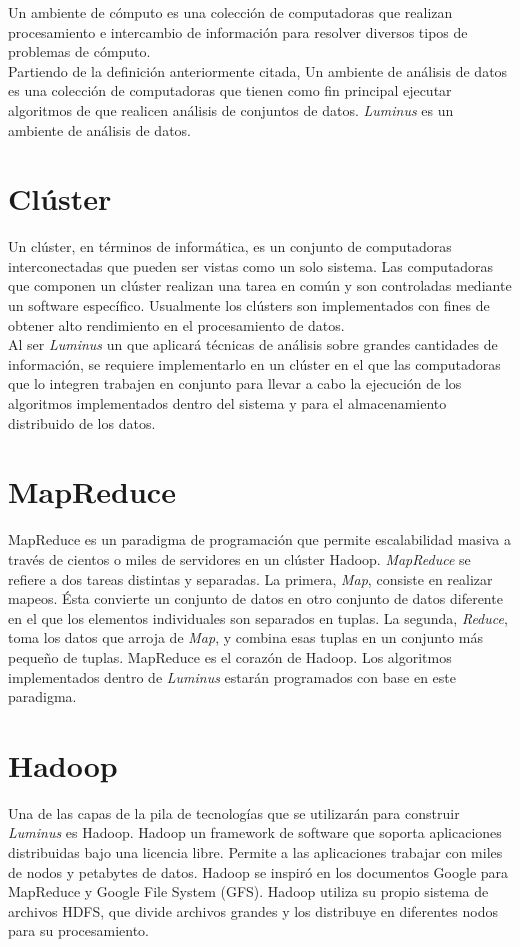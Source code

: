 Un ambiente de cómputo es una colección de computadoras que realizan procesamiento e intercambio de información para resolver diversos tipos de problemas de cómputo.\cite{ambiente}\\

Partiendo de la definición anteriormente citada, Un ambiente de análisis de datos es una colección de computadoras que tienen como fin principal ejecutar algoritmos de que realicen análisis de conjuntos de datos. \emph{Luminus} es un ambiente de análisis de datos.\\

\section{Clúster}
Un clúster, en términos de informática, es un conjunto de computadoras interconectadas que pueden ser vistas como un solo sistema. Las computadoras que componen un clúster realizan una tarea en común y son controladas mediante un software específico. Usualmente los clústers son implementados con fines de obtener alto rendimiento en el procesamiento de datos.\cite{cluster}\\

Al ser \emph{Luminus} un  que aplicará técnicas de análisis sobre grandes cantidades de información, se requiere implementarlo en un clúster en el que las computadoras que lo integren trabajen en conjunto para llevar a cabo la ejecución de los algoritmos implementados dentro del sistema y para el almacenamiento distribuido de los datos.\\

\section{MapReduce}
MapReduce es un paradigma de programación que permite escalabilidad masiva a través de cientos o miles de servidores en un clúster Hadoop. \emph{MapReduce} se refiere a dos tareas distintas y separadas. La primera, \emph{Map}, consiste en realizar mapeos. Ésta convierte un conjunto de datos en otro conjunto de datos diferente en el que los elementos individuales son separados en tuplas. La segunda, \emph{Reduce}, toma los datos que arroja de \emph{Map}, y combina esas tuplas en un conjunto más pequeño de tuplas. MapReduce es el corazón de Hadoop.\cite{mapReduce} Los algoritmos implementados dentro de \emph{Luminus} estarán programados con base en este paradigma.

\section{Hadoop} \label{sect:hadoop}
Una de las capas de la pila de tecnologías que se utilizarán para construir \emph{Luminus} es Hadoop. Hadoop un framework de software que soporta aplicaciones distribuidas bajo una licencia libre. Permite a las aplicaciones trabajar con miles de nodos y petabytes de datos. Hadoop se inspiró en los documentos Google para MapReduce y Google File System (GFS). Hadoop utiliza su propio sistema de archivos HDFS, que divide archivos grandes y los distribuye en diferentes nodos para su procesamiento.\cite{hadoop}\\

